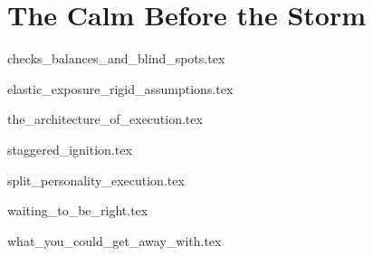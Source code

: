 
\section{The Calm Before the Storm}


{checks_balances_and_blind_spots.tex}

{elastic_exposure_rigid_assumptions.tex}

{the_architecture_of_execution.tex}

{staggered_ignition.tex}

{split_personality_execution.tex}

{waiting_to_be_right.tex}

{what_you_could_get_away_with.tex}